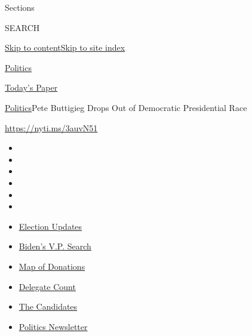 Sections

SEARCH

\protect\hyperlink{site-content}{Skip to
content}\protect\hyperlink{site-index}{Skip to site index}

\href{https://www.nytimes.com/section/politics}{Politics}

\href{https://myaccount.nytimes.com/auth/login?response_type=cookie\&client_id=vi}{}

\href{https://www.nytimes.com/section/todayspaper}{Today's Paper}

\href{/section/politics}{Politics}\textbar{}Pete Buttigieg Drops Out of
Democratic Presidential Race

\url{https://nyti.ms/3auvN51}

\begin{itemize}
\item
\item
\item
\item
\item
\item
\end{itemize}

\begin{itemize}
\item
  \href{https://www.nytimes.com/2020/07/31/us/elections/biden-vs-trump.html?action=click\&pgtype=Article\&state=default\&region=TOP_BANNER\&context=storylines_menu}{Election
  Updates}
\item
  \href{https://www.nytimes.com/article/biden-vice-president-2020.html?action=click\&pgtype=Article\&state=default\&region=TOP_BANNER\&context=storylines_menu}{Biden's
  V.P. Search}
\item
  \href{https://www.nytimes.com/interactive/2020/07/24/us/politics/trump-biden-campaign-donors.html?action=click\&pgtype=Article\&state=default\&region=TOP_BANNER\&context=storylines_menu}{Map
  of Donations}
\item
  \href{https://www.nytimes.com/interactive/2020/us/elections/delegate-count-primary-results.html?action=click\&pgtype=Article\&state=default\&region=TOP_BANNER\&context=storylines_menu}{Delegate
  Count}
\item
  \href{https://www.nytimes.com/interactive/2019/us/politics/2020-presidential-candidates.html?action=click\&pgtype=Article\&state=default\&region=TOP_BANNER\&context=storylines_menu}{The
  Candidates}
\item
  \href{https://www.nytimes.com/newsletters/politics?action=click\&pgtype=Article\&state=default\&region=TOP_BANNER\&context=storylines_menu}{Politics
  Newsletter}
\end{itemize}

